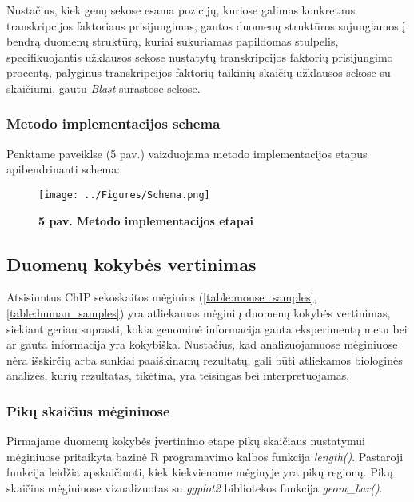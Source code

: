\documentclass[12pt]{article}
\begin{document}
Nustačius, kiek genų sekose esama pozicijų, kuriose galimas konkretaus
transkripcijos faktoriaus prisijungimas, gautos duomenų struktūros sujungiamos
į bendrą duomenų struktūrą, kuriai sukuriamas papildomas stulpelis,
specifikuojantis užklausos sekose nustatytų transkripcijos faktorių
prisijungimo procentą, palyginus transkripcijos faktorių taikinių skaičių
užklausos sekose su skaičiumi, gautu \emph{Blast} surastose sekose. 

\newpage

\subsubsection{Metodo implementacijos schema}
Penktame paveiklse (5 pav.) vaizduojama metodo implementacijos etapus
apibendrinanti schema:

\begin{figure}[ht]
    \begin{center}
        \captionsetup{justification=centering}
        \texttt{[image: ../Figures/Schema.png]}
        \vspace{-1\baselineskip}
        \caption*{\small\textbf{5 pav. Metodo implementacijos etapai}}
    \end{center}
\end{figure}

\newpage


\subsection{Duomenų kokybės vertinimas}
Atsisiuntus ChIP sekoskaitos mėginius (\ref{table:mouse_samples},
\ref{table:human_samples}) yra atliekamas mėginių duomenų kokybės
vertinimas, siekiant geriau suprasti, kokia genominė informacija gauta
eksperimentų metu bei ar gauta informacija yra kokybiška. Nustačius, kad
analizuojamuose mėginiuose nėra išskirčių arba sunkiai paaiškinamų rezultatų,
gali būti atliekamos biologinės analizės, kurių rezultatas, tikėtina, yra
teisingas bei interpretuojamas.

\subsubsection*{Pikų skaičius mėginiuose}
Pirmajame duomenų kokybės įvertinimo etape pikų skaičiaus nustatymui mėginiuose
pritaikyta bazinė R programavimo kalbos funkcija \emph{length()}. Pastaroji
funkcija leidžia apskaičiuoti, kiek kiekviename mėginyje yra pikų regionų.
Pikų skaičius mėginiuose vizualizuotas su \emph{ggplot2}
\cite{GGPLOT2} bibliotekos funkcija \emph{geom\_bar()}.
\end{document}

